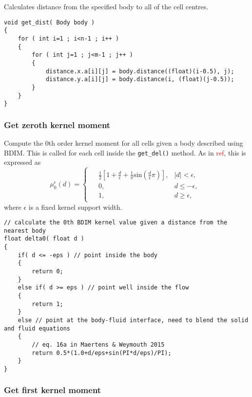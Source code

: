 \documentclass[notitlepage]{article}
\begin{document}
Calculates distance from the specified body to all of the cell centres.

\begin{lstlisting}[style=myCpp]
void get_dist( Body body )
{
	for ( int i=1 ; i<n-1 ; i++ )
	{
		for ( int j=1 ; j<m-1 ; j++ )
		{
			distance.x.a[i][j] = body.distance((float)(i-0.5), j);
			distance.y.a[i][j] = body.distance(i, (float)(j-0.5));
		}
	}
}
\end{lstlisting}

\subsubsection{Get zeroth kernel moment}

Compute the 0th order kernel moment for all cells given a body described using BDIM. This is called
for each cell inside the \texttt{get\_del()} method. As in \textcolor{red}{ref}, this is expressed as
%
\begin{equation}\label{eq:label}
\mu_0^\epsilon(d) =
\begin{cases}
\begin{aligned}
&\frac{1}{2} \left \lbrack 1 + \frac{d}{\epsilon} + \frac{1}{\pi} \mathrm{sin} \left(\frac{d}{\epsilon} \pi \right) \right \rbrack,& \lvert d \rvert < \epsilon , \\
&0,& d \leq -\epsilon, \\
&1,& d \geq \epsilon ,
\end{aligned}
\end{cases}
\end{equation}
%
where $\epsilon$ is a fixed kernel support width.

\begin{lstlisting}[style=myCpp]
// calculate the 0th BDIM kernel value given a distance from the nearest body
float delta0( float d )
{
	if( d <= -eps ) // point inside the body
	{
		return 0;
	}
	else if( d >= eps ) // point well inside the flow
	{
		return 1;
	}
	else // point at the body-fluid interface, need to blend the solid and fluid equations
	{
		// eq. 16a in Maertens & Weymouth 2015
		return 0.5*(1.0+d/eps+sin(PI*d/eps)/PI);
	} 
}
\end{lstlisting}

\subsubsection{Get first kernel moment}
\end{document}
